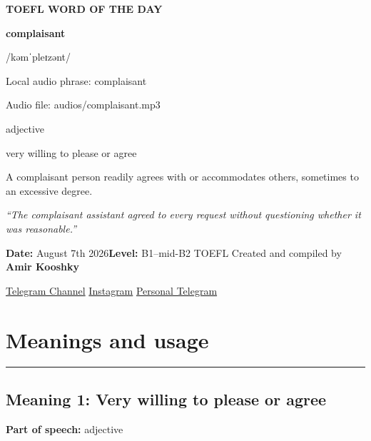 \documentclass[11pt]{article}
\newcommand{\sectionrule}{\par\vspace{-0.5em}\noindent\textcolor{Accent}{\rule{\linewidth}{0.6pt}}\par}
\begin{document}
\begin{center}
{\sffamily\bfseries\color{Accent} TOEFL WORD OF THE DAY\par}
\vspace{8mm}
{\fontsize{42}{48}\selectfont\bfseries complaisant\par}
\vspace{2mm}
{\Large\sffamily\color{Accent} /kəmˈpleɪzənt/\par}
\vspace{2mm}
{\small\sffamily Local audio phrase: complaisant\par}
{\small\sffamily Audio file: audios/complaisant.mp3\par}
\vspace{2mm}
{\large\sffamily\color{Muted} adjective\par}
\vspace{5mm}
{\sffamily very willing to please or agree\par}
\vspace{6mm}
{\large A complaisant person readily agrees with or accommodates others, sometimes to an excessive degree.\par}
\vspace{6mm}
\begin{minipage}{0.84\textwidth}
\itshape “The complaisant assistant agreed to every request without questioning whether it was reasonable.”
\end{minipage}\par
\vspace{10mm}
\textbf{Date:} August 7th 2026\quad\textbullet\quad \textbf{Level:} B1--mid-B2 TOEFL
\vfill
Created and compiled by \textbf{Amir Kooshky}\par
\vspace{2mm}
\href{https://t.me/KooshkyTOEFL}{Telegram Channel}\quad\textbullet\quad
\href{https://www.instagram.com/kooshkytoefl}{Instagram}\quad\textbullet\quad
\href{https://t.me/KooshkyTOEFL\_pv}{Personal Telegram}
\end{center}
\newpage
\tableofcontents
\newpage

\section{Meanings and usage}
\sectionrule
\subsection{Meaning 1: Very willing to please or agree}
\textbf{Part of speech:} adjective
\end{document}
